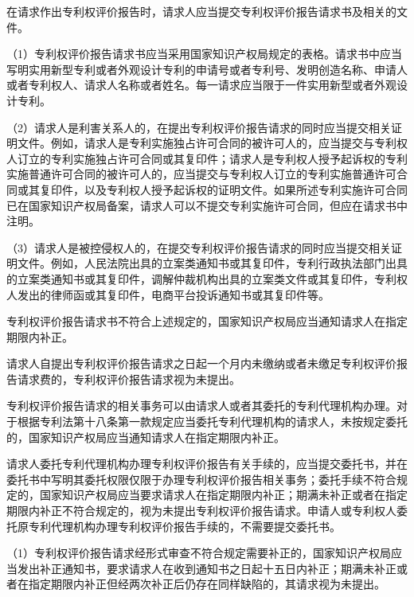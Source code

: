 在请求作出专利权评价报告时，请求人应当提交专利权评价报告请求书及相关的文件。

{\setlength{\parindent}{17.1bp}（1）专利权评价报告请求书应当采用国家知识产权局规定的表格。请求书中应当写明实用新型专利或者外观设计专利的申请号或者专利号、发明创造名称、申请人或者专利权人、请求人名称或者姓名。每一请求应当限于一件实用新型或者外观设计专利。\par}

{\setlength{\parindent}{17.1bp}（2）请求人是利害关系人的，在提出专利权评价报告请求的同时应当提交相关证明文件。例如，请求人是专利实施独占许可合同的被许可人的，应当提交与专利权人订立的专利实施独占许可合同或其复印件；请求人是专利权人授予起诉权的专利实施普通许可合同的被许可人的，应当提交与专利权人订立的专利实施普通许可合同或其复印件，以及专利权人授予起诉权的证明文件。如果所述专利实施许可合同已在国家知识产权局备案，请求人可以不提交专利实施许可合同，但应在请求书中注明。\par}

{\setlength{\parindent}{17.1bp}（3）请求人是被控侵权人的，在提交专利权评价报告请求的同时应当提交相关证明文件。例如，人民法院出具的立案类通知书或其复印件，专利行政执法部门出具的立案类通知书或其复印件，调解仲裁机构出具的立案类文件或其复印件，专利权人发出的律师函或其复印件，电商平台投诉通知书或其复印件等。\par}

专利权评价报告请求书不符合上述规定的，国家知识产权局应当通知请求人在指定期限内补正。

请求人自提出专利权评价报告请求之日起一个月内未缴纳或者未缴足专利权评价报告请求费的，专利权评价报告请求视为未提出。

专利权评价报告请求的相关事务可以由请求人或者其委托的专利代理机构办理。对于根据专利法第十八条第一款规定应当委托专利代理机构的请求人，未按规定委托的，国家知识产权局应当通知请求人在指定期限内补正。

请求人委托专利代理机构办理专利权评价报告有关手续的，应当提交委托书，并在委托书中写明其委托权限仅限于办理专利权评价报告相关事务；委托手续不符合规定的，国家知识产权局应当要求请求人在指定期限内补正；期满未补正或者在指定期限内补正不符合规定的，视为未提出专利权评价报告请求。申请人或专利权人委托原专利代理机构办理专利权评价报告手续的，不需要提交委托书。

{\setlength{\parindent}{17.1bp}（1）专利权评价报告请求经形式审查不符合规定需要补正的，国家知识产权局应当发出补正通知书，要求请求人在收到通知书之日起十五日内补正；期满未补正或者在指定期限内补正但经两次补正后仍存在同样缺陷的，其请求视为未提出。\par}

